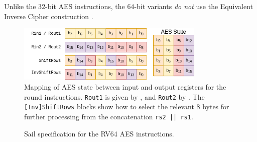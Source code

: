 Unlike the $32$-bit AES instructions, the $64$-bit variants
{\em do not} use the Equivalent Inverse Cipher
construction \cite[Section 5.3.5]{nist:fips:197}.

\begin{figure}[h]
\centering
\includegraphics[width=0.8\textwidth]{diagrams/aes-rv64-state.png}
\caption{
Mapping of AES state between input and output registers for the round
instructions.
{\tt Rout1} is given by ,
and
{\tt Rout2}          by .
The {\tt [Inv]ShiftRows} blocks show how to select the relevant $8$ bytes
for further processing from the concatenation {\tt rs2 || \tt rs1}.
}
\label{fig:aes:rv64:mapping}
\end{figure}

\begin{figure}[h!]

\caption{
Sail specification for the RV64 AES instructions.
}
\label{fig:pesudo:aes:rv64}
\end{figure}

